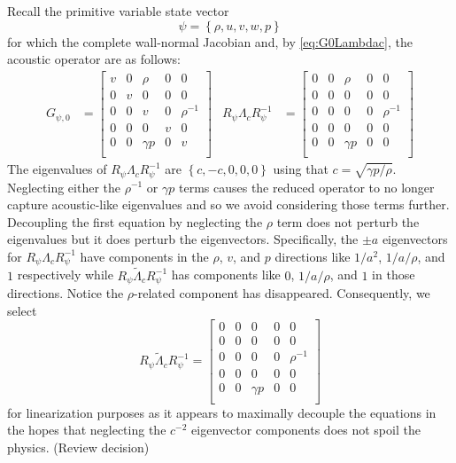 \documentclass[letterpaper,11pt,nointlimits,reqno]{amsart}
\begin{document}
Recall the primitive variable state vector
\begin{equation}
  \psi = \left\{\rho, u, v, w, p\right\}
\end{equation}
for which the complete wall-normal Jacobian and, by \eqref{eq:G0Lambdac}, the
acoustic operator are as follows:
\begin{align}
 G_{\psi,0} &=
 \begin{bmatrix}
   v  &  0  &  \rho       & 0 &  0          \\
   0  &  v  &  0          & 0 &  0          \\
   0  &  0  &  v          & 0 &  \rho^{-1}  \\
   0  &  0  &  0          & v &  0          \\
   0  &  0  &  \gamma{}p  & 0 &  v          \\
 \end{bmatrix}
&
 R_\psi \Lambda_c R_\psi^{-1} &=
 \begin{bmatrix}
   0  &  0  &  \rho       & 0 &  0          \\
   0  &  0  &  0          & 0 &  0          \\
   0  &  0  &  0          & 0 &  \rho^{-1}  \\
   0  &  0  &  0          & 0 &  0          \\
   0  &  0  &  \gamma{}p  & 0 &  0          \\
 \end{bmatrix}
\end{align}
The eigenvalues of $R_\psi \Lambda_c R_\psi^{-1}$ are $\left\{c, -c, 0, 0,
0\right\}$ using that $c=\sqrt{\gamma p / \rho}$.  Neglecting either the
$\rho^{-1}$ or $\gamma p$ terms causes the reduced operator to no longer
capture acoustic-like eigenvalues and so we avoid considering those terms
further.  Decoupling the first equation by neglecting the $\rho$ term does not
perturb the eigenvalues but it does perturb the eigenvectors.  Specifically,
the $\pm{}a$ eigenvectors for $R_\psi \Lambda_c R_\psi^{-1}$ have components in
the $\rho$, $v$, and $p$ directions like $1/a^2$, $1/a/\rho$, and $1$
respectively while $R_\psi \tilde\Lambda_c R_\psi^{-1}$ has components like
$0$, $1/a/\rho$, and $1$ in those directions.  Notice the $\rho$-related
component has disappeared.  Consequently, we select
\begin{equation}\label{eq:approxprim}
 R_\psi \tilde\Lambda_c R_\psi^{-1} =
 \begin{bmatrix}
   0  &  0  &  0          & 0 &  0          \\
   0  &  0  &  0          & 0 &  0          \\
   0  &  0  &  0          & 0 &  \rho^{-1}  \\
   0  &  0  &  0          & 0 &  0          \\
   0  &  0  &  \gamma{}p  & 0 &  0          \\
 \end{bmatrix}
\end{equation}
for linearization purposes as it appears to maximally decouple the equations in
the hopes that neglecting the $c^{-2}$ eigenvector components does not spoil
the physics. {\color{red}(Review decision)}
\end{document}
